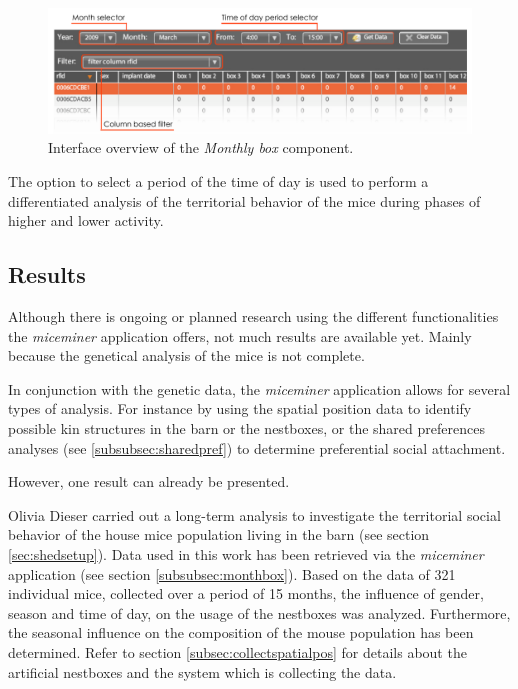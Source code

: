 \begin{figure}[htpb]
\begin{center}
  \includegraphics[width=\textwidth]{assets/pdf/month_box_ant.pdf}
  \caption[\textit{Monthly box} component interface overview]{Interface overview of the \textit{Monthly box} component.}
  \label{fig:month_box_ant}
\end{center}
\end{figure}

The option to select a period of the time of day is used to perform a differentiated analysis of the territorial behavior of the mice during phases of higher and lower activity.

\subsection{Results}
\label{subsec:results}
 
Although there is ongoing or planned research using the different functionalities the \textit{miceminer} application offers, not much results are available yet. Mainly because the genetical analysis of the mice is not complete. 
 
In conjunction with the genetic data, the \textit{miceminer} application allows for several types of analysis. For instance by using the spatial position data to identify possible kin structures in the barn or the nestboxes, or the shared preferences analyses (see \ref{subsubsec:sharedpref}) to determine preferential social attachment. 
 
However, one result can already be presented.
 
Olivia Dieser \citep{dieser:08} carried out a long-term analysis to investigate the territorial social behavior of the house mice population living in the barn (see section \ref{sec:shedsetup}). Data used in this work has been retrieved via the \textit{miceminer} application (see section \ref{subsubsec:monthbox}). Based on the data of 321 individual mice, collected over a period of 15 months, the influence of gender, season and time of day, on the usage of the nestboxes was analyzed. Furthermore, the seasonal influence on the composition of the mouse population has been determined. Refer to section \ref{subsec:collectspatialpos} for details about the artificial nestboxes and the system which is collecting the data.
 
